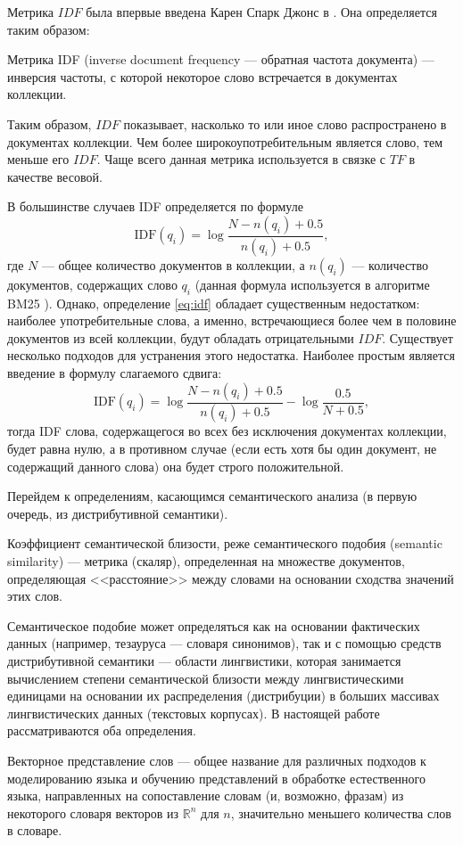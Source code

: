 Метрика $IDF$ была впервые введена Карен Спарк Джонс в \cite{jones2004statistical}. Она определяется таким образом:
\begin{defn}
    Метрика IDF (inverse document frequency --- обратная частота документа) --- инверсия частоты, с которой некоторое слово
    встречается в документах коллекции.
\end{defn}
Таким образом, $IDF$ показывает, насколько то или иное слово распространено в документах коллекции. Чем более широкоупотребительным
является слово, тем меньше его $IDF$. Чаще всего данная метрика используется в связке с $TF$ в качестве весовой.

В большинстве случаев IDF определяется по формуле
\begin{equation}
    \label{eq:idf}
    \text{IDF}(q_i) = \log \frac{N - n(q_i) + 0.5}{n(q_i) + 0.5},
\end{equation}
где $N$ --- общее количество документов в коллекции, а $n(q_i)$ --- количество документов, содержащих слово $q_i$
(данная формула используется в алгоритме BM25 \cite{Amati2009}). Однако, определение \eqref{eq:idf} обладает существенным недостатком:
наиболее употребительные слова, а именно, встречающиеся более чем в половине документов из всей коллекции, будут обладать
отрицательными $IDF$. Существует несколько подходов для устранения этого недостатка. Наиболее простым является введение в формулу
слагаемого сдвига:
\begin{equation}
    \label{eq:shifted-idf}
    \text{IDF}(q_i) = \log \frac{N - n(q_i) + 0.5}{n(q_i) + 0.5} - \log\frac{0.5}{N + 0.5},
\end{equation}
тогда IDF слова, содержащегося во всех без исключения документах коллекции, будет равна нулю, а в противном случае (если есть
хотя бы один документ, не содержащий данного слова) она будет строго положительной.

Перейдем к определениям, касающимся семантического анализа (в первую очередь, из дистрибутивной семантики).
\begin{defn}
    Коэффициент семантической близости, реже семантического подобия (semantic similarity) --- метрика (скаляр), определенная
    на множестве документов, определяющая <<расстояние>> между словами на основании сходства значений этих слов.
\end{defn}

Семантическое подобие может определяться как на основании фактических данных (например, тезауруса --- словаря синонимов),
так и с помощью средств дистрибутивной семантики --- области лингвистики, которая занимается вычислением степени 
семантической близости между лингвистическими единицами на основании их распределения (дистрибуции) в больших массивах
лингвистических данных (текстовых корпусах). В настоящей работе рассматриваются оба определения.

\begin{defn}
    Векторное представление слов --- общее название для различных подходов к моделированию языка и обучению представлений
    в обработке естественного языка, направленных на сопоставление словам (и, возможно, фразам) из некоторого словаря
    векторов из $\mathbb{R}^{n}$ для $n$, значительно меньшего количества слов в словаре.
\end{defn}